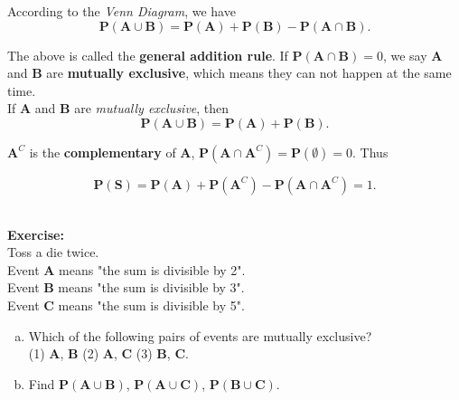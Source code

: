 \documentclass[a4paper, 12pt,twoside]{book}
\begin{document}
According to the \textit{Venn Diagram}, we have 
    $$\textbf{P}(\textbf{A} \cup \textbf{B}) = \textbf{P}(\textbf{A}) + \textbf{P}(\textbf{B}) - \textbf{P}(\textbf{A} \cap \textbf{B}).$$
    
\noindent  The above is called the \textbf{general addition rule}. If $ \textbf{P}(\textbf{A} \cap \textbf{B}) = 0$, we say \textbf{A} and \textbf{B} are \textbf{mutually exclusive}, which means they can not happen at the same time.
  \vspace{0.3cm}\\
  If \textbf{A} and \textbf{B} are \textit{mutually exclusive}, then 
    $$\textbf{P}(\textbf{A} \cup \textbf{B}) = \textbf{P}(\textbf{A}) + \textbf{P}(\textbf{B}) .$$
  
  
 \noindent  $\textbf{A}^C$ is the \textbf{complementary} of \textbf{A},  
  $\textbf{P}(\textbf{A} \cap \textbf{A}^C) = \textbf{P}(\emptyset) = 0$. Thus
   
  $$\textbf{P}(\textbf{S})= \textbf{P}(\textbf{A}) + \textbf{P}(\textbf{A}^C) - \textbf{P}(\textbf{A} \cap \textbf{A}^C) = 1.$$
\vspace{0.6cm}\\
\colorbox{champagne}{\parbox{\textwidth}{
    \textbf{Exercise:}\\
    Toss a die twice.\\
    Event \textbf{A} means "the sum is divisible by 2".\\
    Event \textbf{B} means "the sum is divisible by 3".\\
    Event \textbf{C} means "the sum is divisible by 5".\\
    \begin{enumerate}[(a)]
        \item Which of the following pairs of events are mutually exclusive?\\
        (1) \textbf{A}, \textbf{B} \hspace{0.6cm} (2) \textbf{A}, \textbf{C} \hspace{0.6cm} (3) \textbf{B}, \textbf{C}.        
        \item Find $\textbf{P}(\textbf{A} \cup \textbf{B})$, 
           $ \textbf{P}(\textbf{A} \cup \textbf{C})$,
           $ \textbf{P}(\textbf{B} \cup \textbf{C})$.        
    \end{enumerate}   
}}
\newpage
\end{document}
